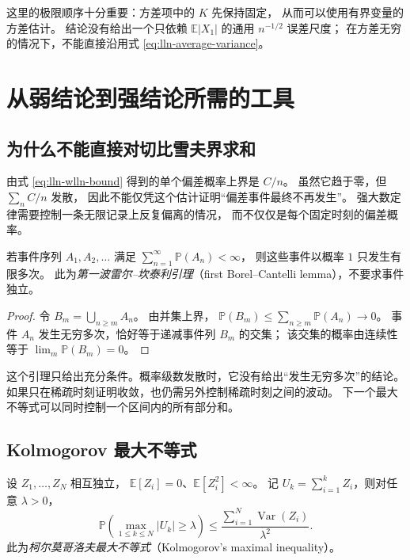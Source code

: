 \documentclass[UTF8,12pt,a4paper,fontset=fandol]{ctexart}
\begin{document}
这里的极限顺序十分重要：方差项中的 $K$ 先保持固定，
从而可以使用有界变量的方差估计。
结论没有给出一个只依赖 $\mathbb E|X_1|$ 的通用 $n^{-1/2}$ 误差尺度；
在方差无穷的情况下，不能直接沿用式 \eqref{eq:lln-average-variance}。

\section{从弱结论到强结论所需的工具}
\label{sec:lln-strong-tools}

\subsection{为什么不能直接对切比雪夫界求和}

由式 \eqref{eq:lln-wlln-bound} 得到的单个偏差概率上界是 $C/n$。
虽然它趋于零，但 $\sum_n C/n$ 发散，
因此不能仅凭这个估计证明“偏差事件最终不再发生”。
强大数定律需要控制一条无限记录上反复偏离的情况，
而不仅仅是每个固定时刻的偏差概率。

\begin{lemma}
\label{lem:lln-borel-cantelli}
若事件序列 $A_1,A_2,\ldots$ 满足
$\sum_{n=1}^\infty\mathbb P(A_n)<\infty$，
则这些事件以概率 $1$ 只发生有限多次。
此为\emph{第一波雷尔--坎泰利引理}（first Borel--Cantelli lemma），不要求事件独立。
\end{lemma}

\begin{proof}
令 $B_m=\bigcup_{n\geq m}A_n$。
由并集上界，
$\mathbb P(B_m)\leq\sum_{n\geq m}\mathbb P(A_n)\to0$。
事件 $A_n$ 发生无穷多次，恰好等于递减事件列 $B_m$ 的交集；
该交集的概率由连续性等于 $\lim_m\mathbb P(B_m)=0$。
\end{proof}

这个引理只给出充分条件。概率级数发散时，它没有给出“发生无穷多次”的结论。
如果只在稀疏时刻证明收敛，也仍需另外控制稀疏时刻之间的波动。
下一个最大不等式可以同时控制一个区间内的所有部分和。

\subsection{Kolmogorov 最大不等式}

\begin{lemma}[独立中心化部分和的最大不等式]
\label{lem:lln-kolmogorov-maximal}
设 $Z_1,\ldots,Z_N$ 相互独立，
$\mathbb E[Z_i]=0$、$\mathbb E[Z_i^2]<\infty$。
记 $U_k=\sum_{i=1}^k Z_i$，则对任意 $\lambda>0$，
\begin{equation}
  \mathbb P\left(\max_{1\leq k\leq N}|U_k|\geq\lambda\right)
  \leq\frac{\sum_{i=1}^N\operatorname{Var}(Z_i)}{\lambda^2}.
  \label{eq:lln-maximal}
\end{equation}
此为\emph{柯尔莫哥洛夫最大不等式}（Kolmogorov's maximal inequality）。
\end{lemma}
\end{document}
